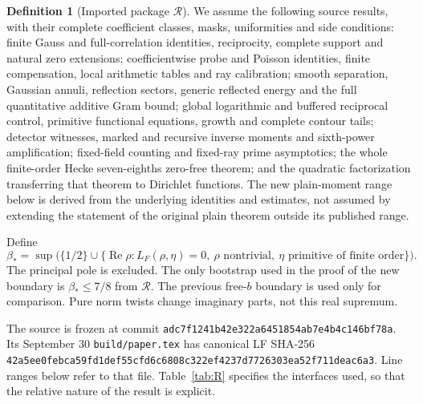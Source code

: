 \documentclass[11pt,a4paper]{article}
\theoremstyle{definition}
\newtheorem{definition}[theorem]{Definition}
\newcommand{\Rea}{\operatorname{Re}}
\newcommand{\bet}{\beta_*}
\newcommand{\src}[1]{\nolinkurl{#1}}
\begin{document}
\begin{definition}[Imported package $\mathcal R$]\label{def:R}
We assume the following source results, with their complete coefficient
classes, masks, uniformities and side conditions:
finite Gauss and full-correlation identities, reciprocity, complete
support and natural zero extensions; coefficientwise probe and Poisson
identities, finite compensation, local arithmetic tables and ray
calibration; smooth separation, Gaussian annuli, reflection sectors,
generic reflected energy and the full quantitative additive Gram bound;
global logarithmic and buffered reciprocal control, primitive functional
equations, growth and complete contour tails; detector witnesses,
marked and recursive inverse moments and sixth-power amplification;
fixed-field counting and fixed-ray prime asymptotics; the whole
finite-order Hecke seven-eighths zero-free theorem; and the quadratic
factorization transferring that theorem to Dirichlet functions.
The new plain-moment range below is derived from the underlying
identities and estimates, not assumed by extending the statement of
the original plain theorem outside its published range.
\end{definition}

Define
\[
 \bet=\sup\bigl(\{1/2\}\cup
 \{\Rea\rho:L_F(\rho,\eta)=0,\ \rho\text{ nontrivial},
                  \ \eta\text{ primitive of finite order}\}\bigr).
\]
The principal pole is excluded. The only bootstrap used in the
proof of the new boundary is $\bet\le7/8$ from $\mathcal R$.
The previous free-$b$ boundary is used only for comparison.
Pure norm twists change imaginary parts, not this real supremum.

The source is frozen at commit
\src{adc7f1241b42e322a6451854ab7e4b4c146bf78a}.
Its September 30 \src{build/paper.tex} has canonical LF SHA-256
\src{42a5ee0febca59fd1def55cfd6c6808c322ef4237d7726303ea52f711deac6a3}.
Line ranges below refer to that file. Table~\ref{tab:R} specifies
the interfaces used, so that the relative nature of the result
is explicit.
\end{document}
